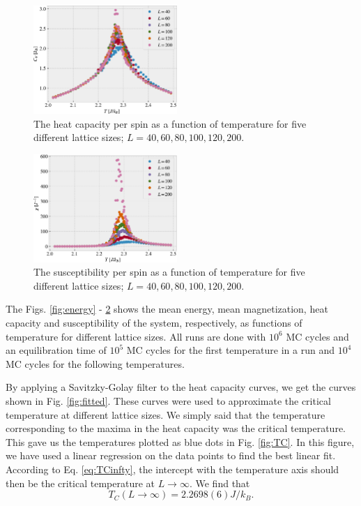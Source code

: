 \documentclass[%
 reprint,
nofootinbib,
aps,
]{revtex4-1}
\begin{document}
\begin{figure}
\includegraphics[width=0.485\textwidth]{../figures/heatcap.pdf}
\caption{The heat capacity per spin as a function of temperature for five different lattice sizes; $L = 40, 60, 80, 100, 120, 200$.}
\label{fig:heatcap}
\end{figure}

\begin{figure}
\includegraphics[width=0.485\textwidth]{../figures/suscept.pdf}
\caption{The susceptibility per spin as a function of temperature for five different lattice sizes; $L = 40, 60, 80, 100, 120, 200$.}
\label{fig:suscept}
\end{figure}

The Figs. \ref{fig:energy} - \ref{fig:suscept} shows the mean energy, mean magnetization, heat capacity and susceptibility of the system, respectively, as functions of temperature for different lattice sizes. All runs are done with $10^6$ MC cycles and an equilibration time of $10^5$ MC cycles for the first temperature in a run and $10^4$ MC cycles for the following temperatures.


By applying a Savitzky-Golay filter to the heat capacity curves, we get the curves shown in Fig. \vref{fig:fitted}. These curves were used to approximate the critical temperature at different lattice sizes. We simply said that the temperature corresponding to the maxima in the heat capacity was the critical temperature. This gave us the temperatures plotted as blue dots in Fig. \vref{fig:TC}. In this figure, we have used a linear regression \citep{squires} on the data points to find the best linear fit. According to Eq. \eqref{eq:TCinfty}, the intercept with the temperature axis should then be the critical temperature at $L\to\infty$. We find that
\begin{equation}
T_C(L\to\infty) = 2.2698(6) J/k_B.
\end{equation}
\end{document}
